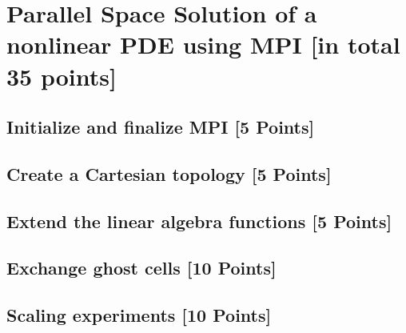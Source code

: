 \documentclass[unicode,11pt,a4paper,oneside,numbers=endperiod,openany]{scrartcl}
\begin{document}
\setassignment
{}

\newline

\assignmentpolicy


\section{Parallel Space Solution of a nonlinear PDE using MPI [in total 35 points]}

\subsection{Initialize and finalize MPI [5 Points]}

\subsection{Create a Cartesian topology [5 Points]}

\subsection{Extend the linear algebra functions [5 Points]}

\subsection{Exchange ghost cells [10 Points]}

\subsection{Scaling experiments [10 Points]}


\end{document}
